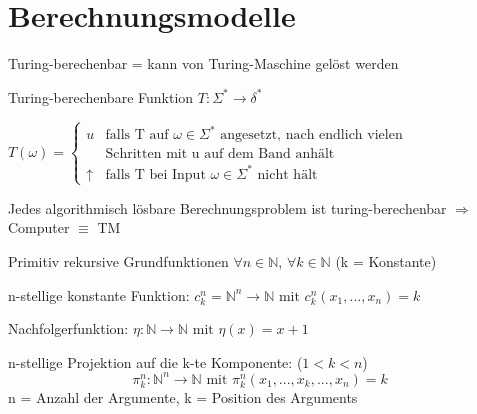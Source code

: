 \graphicspath{{images/}}

\section*{Berechnungsmodelle}

\begin{definition}{Turing-berechenbar} = kann von Turing-Maschine gelöst werden
    
    Turing-berechenbare Funktion $T: \Sigma^* \rightarrow \delta^*$

    $T(\omega) = \begin{cases}
        u & \text{falls T auf } \omega \in \Sigma^* \text{ angesetzt, nach endlich vielen}\\ 
        &\text{Schritten mit u auf dem Band anhält}\\
        \uparrow & \text{falls T bei Input } \omega \in \Sigma^* \text{ nicht hält}
    \end{cases}$
\end{definition}

\begin{remark}
    Jedes algorithmisch lösbare Berechnungsproblem ist turing-berechenbar $\Rightarrow$ Computer $\equiv$ TM
\end{remark}

\begin{theorem}{Primitiv rekursive Grundfunktionen} $\forall n \in \mathbb{N}$, $\forall k \in \mathbb{N}$ {\footnotesize (k = Konstante)}
    
    \vspace{1mm}

    n-stellige konstante Funktion: $c_k^n = \mathbb{N}^n \rightarrow \mathbb{N} \text{ mit } c_k^n (x_1, ... , x_n) = k$

    \vspace{1mm}

    Nachfolgerfunktion: $\eta : \mathbb{N} \rightarrow \mathbb{N} \text{ mit } \eta (x) = x + 1$

    \vspace{1mm}
    
    n-stellige Projektion auf die k-te Komponente: {\footnotesize ($1 < k < n$)}
    $$\pi_k^n : \mathbb{N}^n \rightarrow \mathbb{N} \text{ mit } \pi_k^n (x_1, ... ,x_k,..., x_n) = k$$
    {\small n = Anzahl der Argumente, k = Position des Arguments}
\end{theorem}

